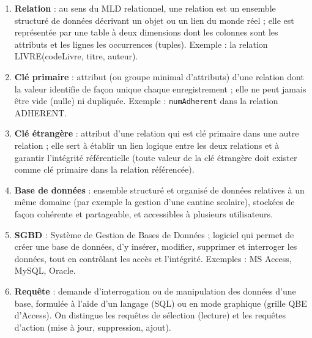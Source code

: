 \documentclass[11pt]{article}
\begin{document}
\begin{corrige}
\begin{enumerate}
  \item \textbf{Relation} : au sens du MLD relationnel, une relation est un ensemble structuré de données décrivant un objet ou un lien du monde réel ; elle est représentée par une table à deux dimensions dont les colonnes sont les attributs et les lignes les occurrences (tuples). Exemple : la relation LIVRE(codeLivre, titre, auteur).
  \item \textbf{Clé primaire} : attribut (ou groupe minimal d'attributs) d'une relation dont la valeur identifie de façon unique chaque enregistrement ; elle ne peut jamais être vide (nulle) ni dupliquée. Exemple : \texttt{numAdherent} dans la relation ADHERENT.
  \item \textbf{Clé étrangère} : attribut d'une relation qui est clé primaire dans une autre relation ; elle sert à établir un lien logique entre les deux relations et à garantir l'intégrité référentielle (toute valeur de la clé étrangère doit exister comme clé primaire dans la relation référencée).
  \item \textbf{Base de données} : ensemble structuré et organisé de données relatives à un même domaine (par exemple la gestion d'une cantine scolaire), stockées de façon cohérente et partageable, et accessibles à plusieurs utilisateurs.
  \item \textbf{SGBD} : Système de Gestion de Bases de Données ; logiciel qui permet de créer une base de données, d'y insérer, modifier, supprimer et interroger les données, tout en contrôlant les accès et l'intégrité. Exemples : MS Access, MySQL, Oracle.
  \item \textbf{Requête} : demande d'interrogation ou de manipulation des données d'une base, formulée à l'aide d'un langage (SQL) ou en mode graphique (grille QBE d'Access). On distingue les requêtes de sélection (lecture) et les requêtes d'action (mise à jour, suppression, ajout).
\end{enumerate}
\end{corrige}
\end{document}
